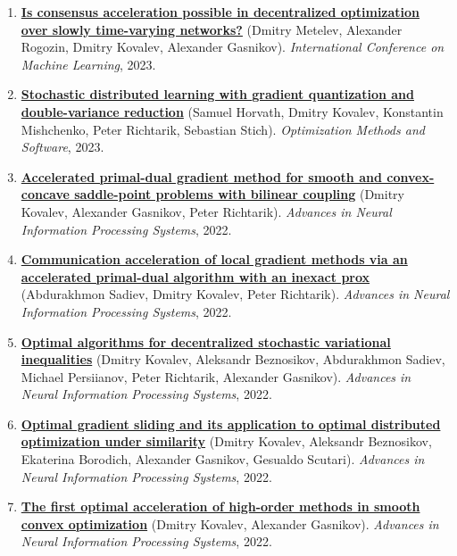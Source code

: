\begin{enumerate}
\item
\textbf{\href{https://proceedings.mlr.press/v202/metelev23a.html}{Is consensus acceleration possible in decentralized optimization over slowly time-varying networks?}} (Dmitry Metelev, Alexander Rogozin, Dmitry Kovalev, Alexander Gasnikov). \textit{International Conference on Machine Learning}, 2023.
\item
\textbf{\href{https://www.tandfonline.com/doi/abs/10.1080/10556788.2022.2117355}{Stochastic distributed learning with gradient quantization and double-variance reduction}} (Samuel Horvath, Dmitry Kovalev, Konstantin Mishchenko, Peter Richtarik, Sebastian Stich). \textit{Optimization Methods and Software}, 2023.
\item
\textbf{\href{https://proceedings.neurips.cc/paper_files/paper/2022/hash/883f66687a521536c505f9b2fbdcbf1e-Abstract-Conference.html}{Accelerated primal-dual gradient method for smooth and convex-concave saddle-point problems with bilinear coupling}} (Dmitry Kovalev, Alexander Gasnikov, Peter Richtarik). \textit{Advances in Neural Information Processing Systems}, 2022.
\item
\textbf{\href{https://proceedings.neurips.cc/paper_files/paper/2022/hash/88c3c482430a62d35e03926a22e4b67e-Abstract-Conference.html}{Communication acceleration of local gradient methods via an accelerated primal-dual algorithm with an inexact prox}} (Abdurakhmon Sadiev, Dmitry Kovalev, Peter Richtarik). \textit{Advances in Neural Information Processing Systems}, 2022.
\item
\textbf{\href{https://proceedings.neurips.cc/paper_files/paper/2022/hash/c959bb2cb164d37569a17fa67494d69a-Abstract-Conference.html}{Optimal algorithms for decentralized stochastic variational inequalities}} (Dmitry Kovalev, Aleksandr Beznosikov, Abdurakhmon Sadiev, Michael Persiianov, Peter Richtarik, Alexander Gasnikov). \textit{Advances in Neural Information Processing Systems}, 2022.
\item
\textbf{\href{https://proceedings.neurips.cc/paper_files/paper/2022/hash/d88f6f81e1aaf606776ffdd06fdf24ef-Abstract-Conference.html}{Optimal gradient sliding and its application to optimal distributed optimization under similarity}} (Dmitry Kovalev, Aleksandr Beznosikov, Ekaterina Borodich, Alexander Gasnikov, Gesualdo Scutari). \textit{Advances in Neural Information Processing Systems}, 2022.
\item
\textbf{\href{https://proceedings.neurips.cc/paper_files/paper/2022/hash/e56f394bbd4f0ec81393d767caa5a31b-Abstract-Conference.html}{The first optimal acceleration of high-order methods in smooth convex optimization}} (Dmitry Kovalev, Alexander Gasnikov). \textit{Advances in Neural Information Processing Systems}, 2022.

\end{enumerate}
